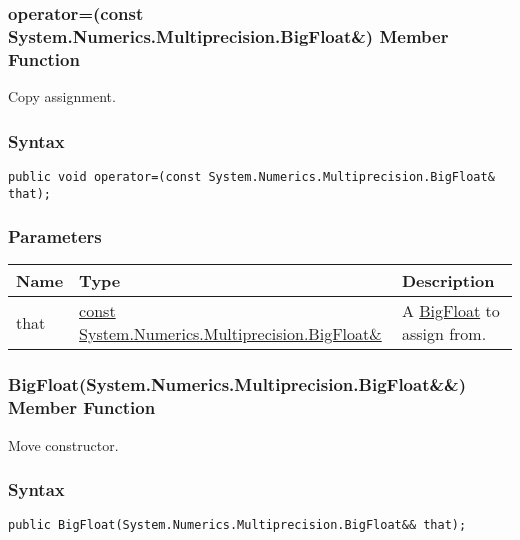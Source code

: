 \documentclass[a4paper,oneside,11.000000pt]{book}
\begin{document}
\hypertarget{System.Numerics.Multiprecision.BigFloat.operator.assign.P.System.Numerics.Multiprecision.BigFloat.C.R.System.Numerics.Multiprecision.BigFloat}{\subsubsection*{operator=(const System.Numerics.Multiprecision.BigFloat\&) Member Function}}\begin{flushleft}
Copy assignment.

\end{flushleft}
\subsubsection*{Syntax}
\texttt{public void operator=(const System.Numerics.Multiprecision.BigFloat\& that);}
\subsubsection*{Parameters}
\begin{flushleft}
\begin{supertabular}[l]{!{\raggedright}p{1.30721cm}!{\raggedright}p{8.55945cm}!{\raggedright}p{4.93333cm}}
\textbf{Name}
& \textbf{Type}
& \textbf{Description}
\\
\hline
that
& \hyperlink{System.Numerics.Multiprecision.BigFloat}{const System.\-Numerics.\-Multiprecision.\-BigFloat\&\-}
& A \hyperlink{System.Numerics.Multiprecision.BigFloat}{BigFloat} to assign from.

\\
\end{supertabular}

\end{flushleft}
\clearpage

\hypertarget{System.Numerics.Multiprecision.BigFloat.constructor.P.System.Numerics.Multiprecision.BigFloat.RR.System.Numerics.Multiprecision.BigFloat}{\subsubsection*{BigFloat(System.Numerics.Multiprecision.BigFloat\&\&) Member Function}}\begin{flushleft}
Move constructor.

\end{flushleft}
\subsubsection*{Syntax}
\texttt{public BigFloat(System.Numerics.Multiprecision.BigFloat\&\& that);}
\end{document}
